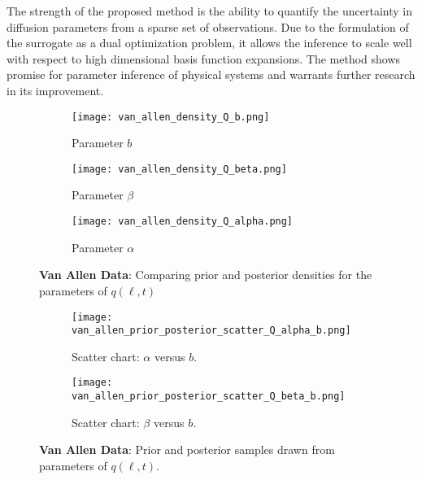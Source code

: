 The strength of the proposed method is the ability to quantify the uncertainty in diffusion 
parameters from a sparse set of observations. Due to the formulation of the surrogate as a dual 
optimization problem, it allows the inference to scale well with respect to high dimensional basis 
function expansions. The method shows promise for parameter inference of physical systems and 
warrants further research in its improvement.

\begin{figure*}[!htb]
  \centering
  \begin{subfigure}[b]{0.5\textwidth}
    \centering
    \texttt{[image: van\_allen\_density\_Q\_b.png]}
    \caption{{\small Parameter $b$}}
    \label{fig:qbvanAllen}
  \end{subfigure}
  \hfill
  \begin{subfigure}[b]{0.5\textwidth}
    \centering
    \texttt{[image: van\_allen\_density\_Q\_beta.png]}
    \caption{{\small Parameter $\beta$}}
    \label{fig:qbetavanAllen}
  \end{subfigure}
  \hfill
  \begin{subfigure}[b]{0.5\textwidth}
    \centering
    \texttt{[image: van\_allen\_density\_Q\_alpha.png]}
    \caption{{\small Parameter $\alpha$}}
    \label{fig:qalphavanAllen}
  \end{subfigure}
  \caption{
    \textbf{Van Allen Data}: Comparing prior and posterior densities 
    for the parameters of $q(\ell, t)$}  
\end{figure*}

\begin{figure*}[!htb]
  \centering
  \begin{subfigure}[b]{0.75\textwidth}
    \centering
    \texttt{[image: van\_allen\_prior\_posterior\_scatter\_Q\_alpha\_b.png]}
    \caption{ 
      {\small Scatter chart: $\alpha$ versus $b$. } 
    }
    \label{fig:alphavsbvanAllen}
  \end{subfigure}
  \hfill
  \begin{subfigure}[b]{0.75\textwidth}
    \centering
    \texttt{[image: van\_allen\_prior\_posterior\_scatter\_Q\_beta\_b.png]}
    \caption{
     {\small  Scatter chart: $\beta$ versus $b$.  }
    }
    \label{fig:betavsbvanAllen}
  \end{subfigure}
  \caption{
    \textbf{Van Allen Data}: Prior and posterior samples 
    drawn from parameters of $q(\ell, t)$.
  }
\end{figure*}





%
%
